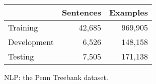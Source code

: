 \begin{figure}[t]
\centering
{\small
\begin{tabular}{|l|r|r|}
        \hline & \textbf{Sentences} & \textbf{Examples} \\
        \hline
        Training & 42,685 & 969,905 \\
        Development & 6,526 & 148,158 \\
        Testing & 7,505 & 171,138 \\
        \hline
\end{tabular}
}
\caption{NLP: the Penn Treebank dataset.}
\label{fig:nlp-datasets}
\end{figure}
